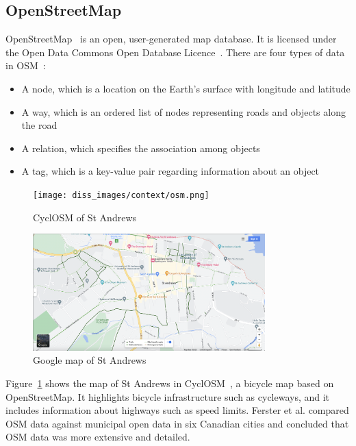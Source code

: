 \documentclass[12pt,a4paper]{report}
\begin{document}
\subsection{OpenStreetMap}\label{sec:openstreetmap}
OpenStreetMap~\cite{OpenStreetMap} is an open, user-generated map database. It is licensed under the Open Data Commons Open Database Licence~\cite{odbl}. There are four types of data in OSM~\cite{9119753}:
\begin{itemize}
    \item A node, which is a location on the Earth's surface with longitude and latitude
    \item A way, which is an ordered list of nodes representing roads and objects along the road
    \item A relation, which specifies the association among objects
    \item A tag, which is a key-value pair regarding information about an object
\end{itemize}

\begin{figure}[ht!]
\centering
\texttt{[image: diss\_images/context/osm.png]}
\caption{CyclOSM of St Andrews}
\label{fig:osm_sta}
\end{figure}

\begin{figure}[ht!]
\centering
\includegraphics[width=0.8\textwidth,trim={10cm 0 10cm 5cm},clip]{diss_images/context/googlemap.png}
\caption{Google map of St Andrews}
\label{fig:google_sta}
\end{figure}

Figure~\ref{fig:osm_sta} shows the map of St Andrews in CyclOSM~\cite{cycleOSM}, a bicycle map based on OpenStreetMap. It highlights bicycle infrastructure such as cycleways, and it includes information about highways such as speed limits. Ferster et al. \cite{doi:10.1080/15568318.2018.1519746} compared OSM data against municipal open data in six Canadian cities and concluded that OSM data was more extensive and detailed.
\end{document}
